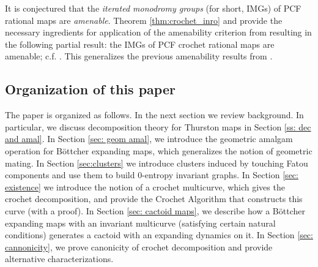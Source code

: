 \documentclass{amsart}
\theoremstyle{plain}
\theoremstyle{definition}
\theoremstyle{remark}
\newcommand{\Jul}{{\mathcal J}}
\newcommand{\CC}{{\mathcal C}}
\newcommand{\cro}{{\operatorname{dec}}}
\begin{document}

It is conjectured that the \emph{iterated monodromy groups} (for short, IMGs) of PCF rational maps are \emph{amenable}. Theorem \ref{thm:crochet_inro} and \cite[Theorem 7.1]{NPT_Amenability}
provide the necessary ingredients for application of the amenability criterion from \cite{Jusch_Nekr_Salle} resulting in the following partial result: the IMGs of PCF crochet rational maps are amenable; c.f. \cite[Corollary 7.2]{NPT_Amenability}. This generalizes the previous amenability results from \cite{AmenabilityInBoundedGroups, H_Thesis}.


\subsection{Organization of this paper} The paper is organized as follows.  In the next section we review background.  In particular, we discuss decomposition theory for Thurston maps in Section \ref{ss: dec and amal}.  In Section \ref{sec: geom amal}, we introduce the geometric amalgam operation for  B\"ottcher expanding maps, which generalizes the notion of geometric mating.  In Section \ref{sec:clusters} we introduce clusters induced by touching Fatou components and use them to build $0$-entropy invariant graphs.  In Section \ref{sec: existence} we introduce the notion of a crochet multicurve, which gives the crochet decomposition,  and provide the Crochet Algorithm that constructs this curve (with a proof).  In Section \ref{sec: cactoid maps}, we describe how a B\"ottcher expanding maps with an invariant multicurve (satisfying certain natural conditions) generates a cactoid with an expanding dynamics on it. In Section \ref{sec: cannonicity}, we prove canonicity of crochet decomposition and provide alternative characterizations. 
\end{document}
